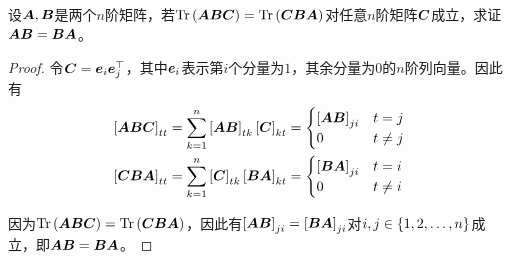 \begin{problem}\label{problem-1.23}
设\(\mata,\matb\)是两个\(n\)阶矩阵，若\(\trace{\mata\matb\matc}=\trace{\matc\matb\mata}\)对任意\(n\)阶矩阵\(\matc\)成立，求证\(\mata\matb=\matb\mata\)。
\end{problem}
\begin{proof}
    令\(\matc=\vece_i\vece_j^\top\)，其中\(\vece_i\)表示第\(i\)个分量为\(1\)，其余分量为\(0\)的\(n\)阶列向量。因此有
    \begin{align*}
        \mat{\mata\matb\matc}_{tt} & =\sum_{k=1}^n\mat{\mata\matb}_{tk}\mat{\matc}_{kt}=
        \begin{cases}
            \mat{\mata\matb}_{ji} & t=j     \\
            0                     & t\neq j
        \end{cases}                                                  \\
        \mat{\matc\matb\mata}_{tt} & =\sum_{k=1}^n\mat{\matc}_{tk}\mat{\matb\mata}_{kt}=
        \begin{cases}
            \mat{\matb\mata}_{ji} & t=i     \\
            0                     & t\neq i
        \end{cases}
    \end{align*}

    因为\(\trace{\mata\matb\matc}=\trace{\matc\matb\mata}\)，因此有\(\mat{\mata\matb}_{ji}=\mat{\matb\mata}_{ji}\)对\(i,j\in\setof{1,2,\dots,n}\)成立，即\(\mata\matb=\matb\mata\)。
\end{proof}

